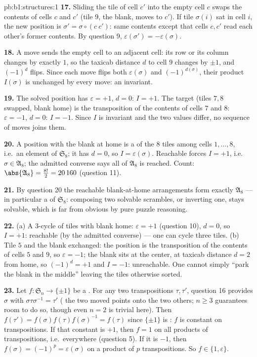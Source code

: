 \begin{solution}{pb:b1:structures:1}
\textbf{17.} Sliding the tile of cell $c'$ into the empty cell
$c$ swaps the contents of cells $c$ and $c'$ (tile $9$, the
blank, moves to $c'$). If tile $\sigma(i)$ sat in cell $i$, the
new position is $\sigma' = \sigma \circ (c\ c')$: same contents
except that cells $c, c'$ read each other's former contents. By
question 9, $\varepsilon(\sigma') = -\varepsilon(\sigma)$.

\textbf{18.} A move sends the empty cell to an adjacent cell: its
row or its column changes by exactly $1$, so the taxicab distance
$d$ to cell $9$ changes by $\pm1$, and $(-1)^d$ flips. Since each
move flips both $\varepsilon(\sigma)$ and $(-1)^{d(\sigma)}$,
their product $I(\sigma)$ is unchanged by every move: an
invariant.

\textbf{19.} The solved position has $\varepsilon = +1$, $d = 0$:
$I = +1$. The target (tiles $7, 8$ swapped, blank home) is the
transposition of the contents of cells $7$ and $8$: $\varepsilon
= -1$, $d = 0$: $I = -1$. Since $I$ is invariant and the two
values differ, no sequence of moves joins them.

\textbf{20.} A position with the blank at home is a 
of the $8$ tiles among cells $1, \dots, 8$, i.e.\ an element of
$\mathfrak S_8$; it has $d = 0$, so $I = \varepsilon(\sigma)$.
Reachable forces $I = +1$, i.e.\ $\sigma \in \mathfrak A_8$; the
admitted converse says all of $\mathfrak A_8$ is reached. Count:
$\abs{\mathfrak A_8} = \frac{8!}2 = 20\,160$ (question 11).

\textbf{21.} By question 20 the reachable blank-at-home
arrangements form exactly $\mathfrak A_8$ --- in particular a
\emph{} of $\mathfrak S_8$: composing two solvable
scrambles, or inverting one, stays solvable, which is far from
obvious by pure puzzle reasoning.

\textbf{22.} (a) A $3$-cycle of tiles with blank home:
$\varepsilon = +1$ (question 10), $d = 0$, so $I = +1$: reachable
(by the admitted converse) --- one can cycle three tiles.
(b) Tile $5$ and the blank exchanged: the position is the
transposition of the contents of cells $5$ and $9$, so
$\varepsilon = -1$; the blank sits at the center, at taxicab
distance $d = 2$ from home, so $(-1)^d = +1$ and $I = -1$:
unreachable. One cannot simply ``park the blank in the middle''
leaving the tiles otherwise sorted.

\textbf{23.} Let $f \colon \mathfrak S_n \to \{\pm1\}$ be a
. For any two transpositions $\tau, \tau'$, question 16
provides $\sigma$ with $\sigma\tau\sigma^{-1} = \tau'$ ( the
two moved points onto the two others; $n \geq 3$ guarantees room
to do so, though even $n = 2$ is trivial here). Then $f(\tau') =
f(\sigma)f(\tau)f(\sigma)^{-1} = f(\tau)$ since $\{\pm1\}$ is
: $f$ is constant on transpositions. If that constant is
$+1$, then $f = 1$ on all products of transpositions, i.e.\
everywhere (question 5). If it is $-1$, then $f(\sigma) =
(-1)^p = \varepsilon(\sigma)$ on a product of $p$ transpositions.
So $f \in \{1, \varepsilon\}$.


\end{solution}
